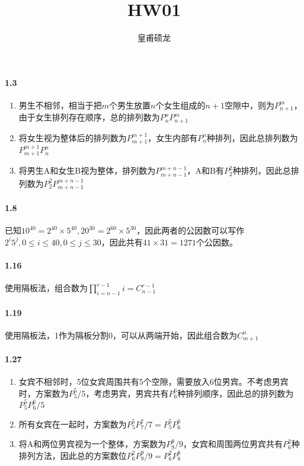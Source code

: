 \documentclass[UTF8]{ctexart}
\title{HW01}
\author{皇甫硕龙}
\newcommand{\pe}[2]{P_{#1}^{#2}}
\newcommand{\co}[2]{C_{#1}^{#2}}
\begin{document}
    \maketitle
    \paragraph*{1.3}

    \begin{enumerate}[label=\textbf{(\arabic*)}, itemsep=0.2em]
        \item 男生不相邻，相当于把$m$个男生放置$n$个女生组成的$n+1$空隙中，则为$\pe{n+1}{m}$，由于女生排列存在顺序，总的排列数为$\pe nn\pe{n+1}{m}$
        \item 将女生视为整体后的排列数为$\pe{m+1}{m+1}$，女生内部有$\pe{n}{n}$种排列，因此总排列数为$\pe{m+1}{m+1}\pe{n}{n}$
        \item 将男生A和女生B视为整体，排列数为$\pe{m+n-1}{m+n-1}$，A和B有$\pe 22$种排列，因此总排列数为$\pe 22\pe{m+n-1}{m+n-1}$
    \end{enumerate}

    \paragraph*{1.8}

    已知$10^{40} = 2^{40}\times 5^{40}, 20^{30} = 2^{60}\times 5^{30}$，因此两者的公因数可以写作$2^i5^j, 0\leq i\leq 40, 0\leq j\leq 30$，因此共有$41\times 31 = 1271$个公因数。

    \paragraph*{1.16} 使用隔板法，组合数为$\prod _{i=n-1}^{r-1}i = \co{n-1}{r-1}$
    \paragraph*{1.19} 使用隔板法，1作为隔板分割0，可以从两端开始，因此组合数为$\co{m+1}{n}$
    \paragraph*{1.27} 
    
    \begin{enumerate}[label=\textbf{(\arabic*)}, itemsep=0.2em]
        \item 女宾不相邻时，5位女宾周围共有5个空隙，需要放入6位男宾。不考虑男宾时，方案数为$\pe 55/5$，考虑男宾，男宾共有$\pe 66$种排列顺序，因此总的排列数为$\pe 55\pe 66/5$
        \item 所有女宾在一起时，方案数为$\pe 55\pe 77 / 7 = \pe 55\pe 66$
        \item 将A和两位男宾视为一个整体，方案数为$\pe 99 / 9$，女宾和周围两位男宾共有$\pe 62$种排列方法，因此总的方案数位$\pe 62\pe 99 / 9 = \pe 62\pe 88$
    \end{enumerate}
\end{document}
